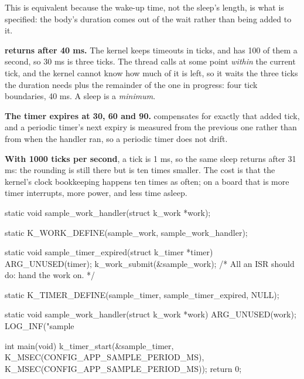 \noindent This is equivalent because the wake-up time, not the sleep's length, is what is specified:
the body's duration comes out of the wait rather than being added to it. 

\textbf{ returns after 40 ms.} The kernel keeps timeouts in ticks, and
 has 100 of them a second, so 30 ms is three ticks. The thread calls at some point
\emph{within} the current tick, and the kernel cannot know how much of it is left, so it waits the
three ticks the duration needs plus the remainder of the one in progress: four tick boundaries,
40 ms. A sleep is a \emph{minimum}. 

\textbf{The timer expires at 30, 60 and 90.}  compensates for exactly that
added tick, and a periodic timer's next expiry is measured from the previous one rather than from
when the handler ran, so a periodic timer does not drift. 

\textbf{With 1000 ticks per second}, a tick is 1 ms, so the same sleep returns after 31 ms: the
rounding is still there but is ten times smaller. The cost is that the kernel's clock bookkeeping
happens ten times as often; on a board that is more timer interrupts, more power, and less time
asleep. 



\begin{ccode}
static void sample_work_handler(struct k_work *work);

static K_WORK_DEFINE(sample_work, sample_work_handler);

static void sample_timer_expired(struct k_timer *timer)
{
	ARG_UNUSED(timer);
	k_work_submit(&sample_work);          /* All an ISR should do: hand the work on. */
}

static K_TIMER_DEFINE(sample_timer, sample_timer_expired, NULL);

static void sample_work_handler(struct k_work *work)
{
	ARG_UNUSED(work);
	LOG_INF("sample %
}

int main(void)
{
	k_timer_start(&sample_timer, K_MSEC(CONFIG_APP_SAMPLE_PERIOD_MS),
		      K_MSEC(CONFIG_APP_SAMPLE_PERIOD_MS));
	return 0;
}
\end{ccode}

\noindent{}

